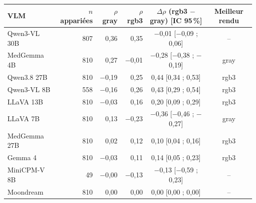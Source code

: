 \begin{tabular}{lrrrcc}
\toprule
VLM & $n$ appariées & $\rho$ gray & $\rho$ rgb3 & $\Delta\rho$ (rgb3 $-$ gray) [IC 95\,\%] & Meilleur rendu \\
\midrule
Qwen3-VL 30B & 807 & 0,36 & 0,35 & $-$0,01 [$-$0,09 ; 0,06] & -- \\
MedGemma 4B & 810 & 0,27 & $-$0,01 & $-$0,28 [$-$0,38 ; $-$0,19] & gray \\
Qwen3.8 27B & 810 & $-$0,19 & 0,25 & 0,44 [0,34 ; 0,53] & rgb3 \\
Qwen3-VL 8B & 558 & $-$0,16 & 0,26 & 0,43 [0,29 ; 0,54] & rgb3 \\
LLaVA 13B & 810 & $-$0,03 & 0,16 & 0,20 [0,09 ; 0,29] & rgb3 \\
LLaVA 7B & 810 & 0,13 & $-$0,23 & $-$0,36 [$-$0,46 ; $-$0,27] & gray \\
MedGemma 27B & 810 & 0,02 & 0,12 & 0,10 [0,04 ; 0,16] & rgb3 \\
Gemma 4 & 810 & $-$0,03 & 0,11 & 0,14 [0,05 ; 0,23] & rgb3 \\
MiniCPM-V 8B & 49 & $-$0,00 & $-$0,13 & $-$0,13 [$-$0,59 ; 0,23] & -- \\
Moondream & 810 & 0,00 & 0,00 & 0,00 [0,00 ; 0,00] & -- \\
\bottomrule
\end{tabular}

